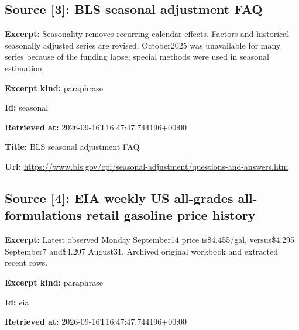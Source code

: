 \documentclass[11pt]{article}
\begin{document}
\subsection*{\textcolor{epdarkgreen}{Source [3]: BLS seasonal adjustment FAQ}}
\par\noindent\textbf{Excerpt:} Seasonality removes recurring calendar effects. Factors and historical seasonally adjusted series are revised. October2025 was unavailable for many series because of the funding lapse; special methods were used in seasonal estimation.

\par\noindent\textbf{Excerpt kind:} paraphrase

\par\noindent\textbf{Id:} seasonal

\par\noindent\textbf{Retrieved at:} 2026-09-16T1\hspace{0pt}6:47:47.7441\hspace{0pt}96+00:00

\par\noindent\textbf{Title:} BLS seasonal adjustment FAQ

\par\noindent\textbf{Url:} \href{https://www.bls.gov/cpi/seasonal-adjustment/questions-and-answers.htm}{https://www.\hspace{0pt}bls.gov/cpi/\hspace{0pt}seasonal-adj\hspace{0pt}ustment/ques\hspace{0pt}tions-and-an\hspace{0pt}swers.htm}

\subsection*{\textcolor{epdarkgreen}{Source [4]: EIA weekly US all-grades all-formulations retail gasoline price history}}
\par\noindent\textbf{Excerpt:} Latest observed Monday September14 price is\$4.455/gal, versus\$4.295 September7 and\$4.207 August31. Archived original workbook and extracted recent rows.

\par\noindent\textbf{Excerpt kind:} paraphrase

\par\noindent\textbf{Id:} eia

\par\noindent\textbf{Retrieved at:} 2026-09-16T1\hspace{0pt}6:47:47.7441\hspace{0pt}96+00:00
\end{document}
